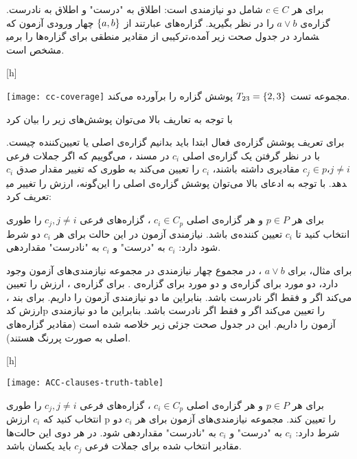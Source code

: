 
برای هر 
$c \in C$
 شامل دو نیازمندی است: اطلاق  به "درست" و اطلاق  به نادرست. گزاره‌ی
$a \vee b$
 را در نظر بگیرید. گزاره‌های  عبارتند از 
 $\left\{ a, b \right\}$
 چهار ورودی آزمون که ترکیبی از مقادیر منطقی برای گزاره‌ها را برمی‎شمارد در جدول صحت زیر آمده، مشخص است.

[h]
\raggedright
\texttt{[image: cc-coverage]}
\vspace{0.1em}
مجموعه تست 
$T_{23} = \left\{ 2, 3 \right\}$
 پوشش گزاره را برآورده می‌کند.

با توجه به تعاریف بالا می‌توان پوشش‌های زیر را بیان کرد


برای تعریف پوشش گزاره‌ی فعال ابتدا باید بدانیم گزاره‌ی اصلی یا تعیین‌کننده چیست. با در نظر گرفتن یک گزاره‌ی اصلی 
$c_i$
 در مسند ، می‌گوییم که اگر جملات فرعی
$c_j \in p، j \neq i$
 مقادیری داشته باشند، 
 $c_i$
  را تعیین می‌‌کند به طوری که تغییر مقدار صدق 
$c_i$
 ، ارزش  را تغییر می‎دهد. با توجه به ادعای بالا می‌توان پوشش گزاره‌ی اصلی را این‌گونه تعریف کرد:
 
برای هر
$p \in P$
 و هر گزاره‌ی اصلی 
$c_i \in C_p$
، گزاره‌های فرعی
$c_j, j \neq i$
را طوری انتخاب کنید تا
$c_i$
 تعیین کننده‌ی  باشد. نیازمندی آزمون در این حالت برای هر
$c_i$
 دو شرط دارد: 
$c_i$
 به "درست" و 
$c_i$
 به "نادرست" مقداردهی ‎شود.
 
 برای مثال، برای
$a \vee b$
  ، در مجموع چهار نیازمندی در مجموعه نیازمندی‌های آزمون وجود دارد، دو مورد برای گزاره‌ی  و دو مورد برای گزاره‌ی . برای گزاره‌ی ،  ارزش  را تعیین می‌‌کند اگر و فقط اگر  نادرست باشد. بنابراین ما دو نیازمندی آزمون 
   را داریم. برای بند ،  ارزش کد{p} را تعیین می‌‌کند اگر و فقط اگر  نادرست باشد. بنابراین ما دو نیازمندی آزمون 
 را داریم. این در جدول صحت جزئی زیر خلاصه شده است (مقادیر گزاره‌های اصلی به صورت پررنگ هستند).
 
 
[h]
\raggedright
\texttt{[image: ACC-clauses-truth-table]}
\vspace{0.1em}



برای هر 
$p \in P$
 و هر گزاره‌ی اصلی 
$c_i\in C_p$
 ، گزاره‌های فرعی
$c_j, j \neq i$
 را طوری انتخاب کنید که 
$c_i$
 ارزش p را تعیین کند. مجموعه نیازمندی‌های آزمون برای هر
$c_i$
 دو شرط دارد: 
$c_i$
 به "درست" و 
$c_i$
 به "نادرست" مقداردهی شود. در هر دوی این حالت‌ها مقادیر انتخاب شده برای جملات فرعی 
$c_j$
 باید یکسان باشد.
 
